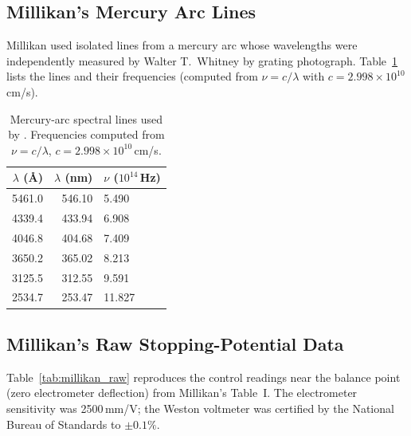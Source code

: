\documentclass[12pt]{article}
\begin{document}
\subsection{Millikan's Mercury Arc Lines}

Millikan used isolated lines from a mercury arc whose wavelengths were
independently measured by Walter T.\ Whitney by grating photograph.
Table~\ref{tab:hg_lines} lists the lines and their frequencies (computed
from $\nu = c/\lambda$ with $c = 2.998\times10^{10}$\,cm/s).

\begin{table}[ht]
\centering
\caption{Mercury-arc spectral lines used by \citet{Millikan1916}.
Frequencies computed from $\nu = c/\lambda$,
$c = 2.998\times10^{10}$\,cm/s.}
\label{tab:hg_lines}
\begin{tabular}{rrl}
\toprule
$\lambda$ (\AA) & $\lambda$ (nm) & $\nu$ ($10^{14}$\,Hz) \\
\midrule
5461.0 & 546.10 & 5.490 \\
4339.4 & 433.94 & 6.908 \\
4046.8 & 404.68 & 7.409 \\
3650.2 & 365.02 & 8.213 \\
3125.5 & 312.55 & 9.591 \\
2534.7 & 253.47 & 11.827 \\
\bottomrule
\end{tabular}
\end{table}

\subsection{Millikan's Raw Stopping-Potential Data}

Table~\ref{tab:millikan_raw} reproduces the control readings near the
balance point (zero electrometer deflection) from Millikan's Table~I.
The electrometer sensitivity was 2500\,mm/V; the Weston voltmeter was
certified by the National Bureau of Standards to $\pm0.1\%$.
\end{document}

